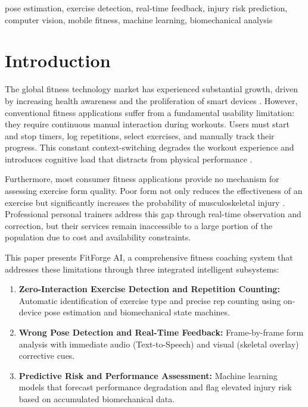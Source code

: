 \documentclass[conference]{IEEEtran}
\begin{document}
\begin{IEEEkeywords}
pose estimation, exercise detection, real-time feedback, injury risk prediction, computer vision, mobile fitness, machine learning, biomechanical analysis
\end{IEEEkeywords}

\section{Introduction}

The global fitness technology market has experienced substantial growth, driven by increasing health awareness and the proliferation of smart devices \cite{b1}. However, conventional fitness applications suffer from a fundamental usability limitation: they require continuous manual interaction during workouts. Users must start and stop timers, log repetitions, select exercises, and manually track their progress. This constant context-switching degrades the workout experience and introduces cognitive load that distracts from physical performance \cite{b2}.

Furthermore, most consumer fitness applications provide no mechanism for assessing exercise form quality. Poor form not only reduces the effectiveness of an exercise but significantly increases the probability of musculoskeletal injury \cite{b3}. Professional personal trainers address this gap through real-time observation and correction, but their services remain inaccessible to a large portion of the population due to cost and availability constraints.

This paper presents FitForge AI, a comprehensive fitness coaching system that addresses these limitations through three integrated intelligent subsystems:

\begin{enumerate}
\item \textbf{Zero-Interaction Exercise Detection and Repetition Counting:} Automatic identification of exercise type and precise rep counting using on-device pose estimation and biomechanical state machines.
\item \textbf{Wrong Pose Detection and Real-Time Feedback:} Frame-by-frame form analysis with immediate audio (Text-to-Speech) and visual (skeletal overlay) corrective cues.
\item \textbf{Predictive Risk and Performance Assessment:} Machine learning models that forecast performance degradation and flag elevated injury risk based on accumulated biomechanical data.
\end{enumerate}
\end{document}
